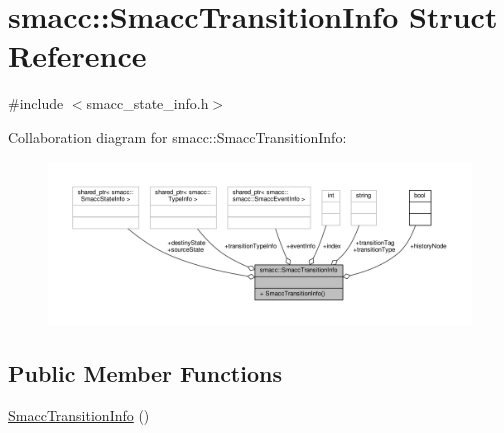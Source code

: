 \hypertarget{structsmacc_1_1SmaccTransitionInfo}{}\section{smacc\+:\+:Smacc\+Transition\+Info Struct Reference}
\label{structsmacc_1_1SmaccTransitionInfo}


{\ttfamily \#include $<$smacc\+\_\+state\+\_\+info.\+h$>$}



Collaboration diagram for smacc\+:\+:Smacc\+Transition\+Info\+:
\nopagebreak
\begin{figure}[H]
\begin{center}
\leavevmode
\includegraphics[width=350pt]{structsmacc_1_1SmaccTransitionInfo__coll__graph}
\end{center}
\end{figure}
\subsection*{Public Member Functions}
\begin{DoxyCompactItemize}
\item 
\hyperlink{structsmacc_1_1SmaccTransitionInfo_aeffa0a573683a8779f93ca43e030a541}{Smacc\+Transition\+Info} ()
\end{DoxyCompactItemize}
